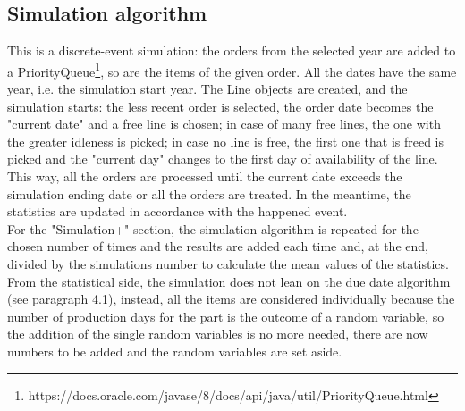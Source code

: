 \documentclass[a4paper,12pt]{article}
\begin{document}
\subsection{Simulation algorithm}
 This is a discrete-event simulation: the orders from the selected year are added to a PriorityQueue\footnote{https://docs.oracle.com/javase/8/docs/api/java/util/PriorityQueue.html}, so are the items of the given order. All the dates have the same year, i.e. the simulation start year. The Line objects are created, and the simulation starts: the less recent order is selected, the order date becomes the "current date" and a free line is chosen; in case of many free lines, the one with the greater idleness is picked; in case no line is free, the first one that is freed is picked and the "current day" changes to the first day of availability of the line. This way, all the orders are processed until the current date exceeds the simulation ending date or all the orders are treated. In the meantime, the statistics are updated in accordance with the happened event. \\
For the "Simulation+" section, the simulation algorithm is repeated for the chosen number of times and the results are added each time and, at the end, divided by the simulations number to calculate the mean values of the statistics.\\
From the statistical side, the simulation does not lean on the due date algorithm (see paragraph 4.1), instead, all the items are considered individually because the number of production days for the part  is the outcome of a random variable, so the addition of the single random variables is no more needed, there are now numbers to be added and the random variables are set aside.

\newpage
\end{document}
